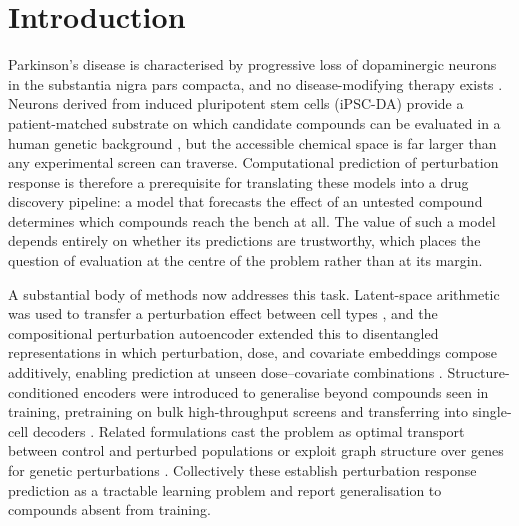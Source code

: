 \documentclass[5p,times,twocolumn]{elsarticle}
\begin{document}

\section{Introduction}

Parkinson's disease is characterised by progressive loss of dopaminergic
neurons in the substantia nigra pars compacta, and no disease-modifying
therapy exists \cite{jang2020current, barker2024history}. Neurons derived from
induced pluripotent stem cells (iPSC-DA) provide a patient-matched substrate on
which candidate compounds can be evaluated in a human genetic background
\cite{oz2023neural}, but the accessible chemical space is far larger than any
experimental screen can traverse. Computational prediction of perturbation
response is therefore a prerequisite for translating these models into a drug
discovery pipeline: a model that forecasts the effect of an untested compound
determines which compounds reach the bench at all. The value of such a model
depends entirely on whether its predictions are trustworthy, which places the
question of evaluation at the centre of the problem rather than at its margin.

A substantial body of methods now addresses this task. Latent-space arithmetic
was used to transfer a perturbation effect between cell types
\cite{lotfollahi2019scgen}, and the compositional perturbation autoencoder
extended this to disentangled representations in which perturbation, dose, and
covariate embeddings compose additively, enabling prediction at unseen
dose--covariate combinations \cite{lotfollahi2023predicting}. Structure-conditioned
encoders were introduced to generalise beyond compounds seen in training,
pretraining on bulk high-throughput screens and transferring into single-cell
decoders \cite{hetzel2022predicting}. Related formulations cast the problem as
optimal transport between control and perturbed populations
\cite{bunne2023learning} or exploit graph structure over genes for genetic
perturbations \cite{roohani2024predicting}. Collectively these establish
perturbation response prediction as a tractable learning problem and report
generalisation to compounds absent from training.
\end{document}
